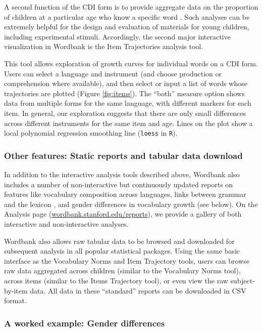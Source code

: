 \documentclass[man,noapacite]{apa}
\begin{document}
A second function of the CDI form is to provide aggregate data on the proportion of children at a particular age who know a specific word \cite{dale1996,jorgensen2010}. Such analyses can be extremely helpful for the design and evaluation of materials for young children, including experimental stimuli. Accordingly, the second major interactive visualization in Wordbank is the Item Trajectories analysis tool. 

This tool allows exploration of growth curves for individual words on a CDI form. Users can select a language and instrument (and choose production or comprehension where available), and then select or input a list of words whose trajectories are plotted (Figure \ref{fig:items}). The ``both'' measure option shows data from multiple forms for the same language, with different markers for each item. In general, our exploration suggests that there are only small differences across different instruments for the same item and age. Lines on the plot show a local polynomial regression smoothing line (\texttt{loess} in \texttt{R}). 

\subsubsection{Other features: Static reports and tabular data download}

In addition to the interactive analysis tools described above, Wordbank also includes a number of non-interactive but continuously updated reports on features like vocabulary composition across languages, links between grammar and the lexicon \cite{braginsky2015}, and gender differences in vocabulary growth (see below). On the Analysis page (\url{wordbank.stanford.edu/reports}), we provide a gallery of both interactive and non-interactive analyses. 

Wordbank also allows raw tabular data to be browsed and downloaded for subsequent analysis in all popular statistical packages. Using the same basic interface as the Vocabulary Norms and Item Trajectory tools, users can browse raw data aggregated across children (similar to the Vocabulary Norms tool), across items (similar to the Items Trajectory tool), or even view the raw subject-by-item data. All data in these ``standard'' reports can be downloaded in CSV format. 

\subsubsection{A worked example: Gender differences}
\end{document}
